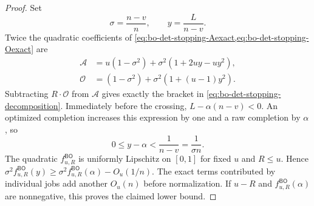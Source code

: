 \begin{proof}
Set
\begin{equation}
 \sigma=\frac{n-v}{n},
 \qquad y=\frac{L}{n-v}.
 \label{eq:bo-det-stopping-coordinates}
\end{equation}
Twice the quadratic coefficients of
\cref{eq:bo-det-stopping-Aexact,eq:bo-det-stopping-Oexact} are
\begin{align*}
 \mathcal A
 &=u(1-\sigma^2)+\sigma^2(1+2uy-uy^2),\\
 \mathcal O
 &=(1-\sigma^2)+\sigma^2(1+(u-1)y^2).
\end{align*}
Subtracting $R\cdot\mathcal O$ from $\mathcal A$ gives exactly the bracket in
\eqref{eq:bo-det-stopping-decomposition}.  Immediately before the crossing,
$L-\alpha(n-v)<0$.  An optimized completion increases this expression by
one and a raw completion by $\alpha$, so
\begin{equation}
 0\le y-\alpha<\frac1{n-v}=\frac1{\sigma n}.
 \label{eq:bo-det-stopping-overshoot}
\end{equation}
The quadratic $f^{\mathsf{BO}}_{u,R}$ is uniformly Lipschitz on $[0,1]$ for
fixed $u$ and $R\le u$.  Hence
$\sigma^2f^{\mathsf{BO}}_{u,R}(y)
\ge\sigma^2f^{\mathsf{BO}}_{u,R}(\alpha)-O_u(1/n)$.
The exact terms contributed by individual jobs add another $O_u(n)$ before
normalization.
If $u-R$ and $f^{\mathsf{BO}}_{u,R}(\alpha)$ are nonnegative, this proves
the claimed lower bound.
\end{proof}

